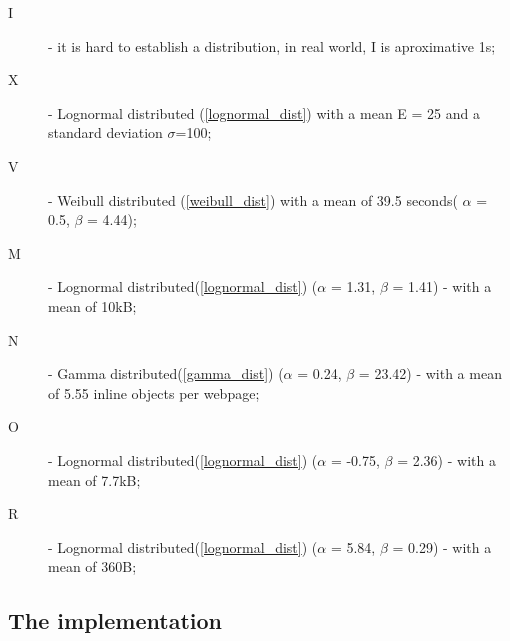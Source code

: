 \begin{description}
 \item[I] - it is hard to establish a distribution, in real world, I is aproximative 1s;
 \item[X] - Lognormal distributed (\ref{lognormal_dist}) with a mean E = 25 and a standard deviation $\sigma$=100;
 \item[V] - Weibull distributed (\ref{weibull_dist}) with a mean of 39.5 seconds( $\alpha$ = 0.5, $\beta$ = 4.44);
 \item[M] - Lognormal distributed(\ref{lognormal_dist}) ($\alpha$ = 1.31, $\beta$ = 1.41) - with a mean of 10kB;
 \item[N] - Gamma distributed(\ref{gamma_dist}) ($\alpha$ = 0.24, $\beta$ = 23.42) - with a mean of 5.55 inline objects per webpage;
 \item[O] - Lognormal distributed(\ref{lognormal_dist}) ($\alpha$ = -0.75, $\beta$ = 2.36) - with a mean of 7.7kB;
 \item[R] - Lognormal distributed(\ref{lognormal_dist}) ($\alpha$ = 5.84, $\beta$ = 0.29) - with a mean of 360B;
\end{description}

\subsection{The implementation}

